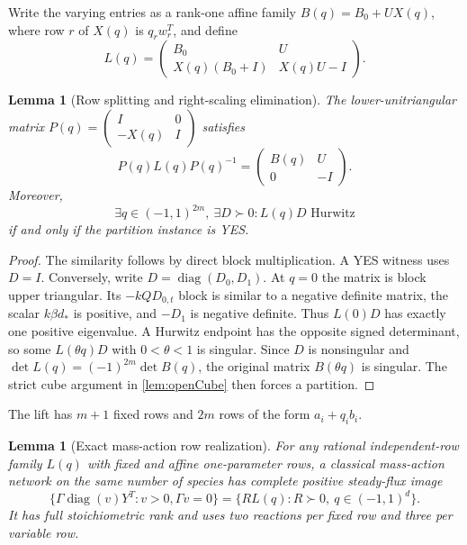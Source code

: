 \documentclass[11pt]{article}
\newtheorem{lemma}[theorem]{Lemma}
\theoremstyle{definition}
\newcommand{\diag}{\operatorname{diag}}
\begin{document}
Write the varying entries as a rank-one affine family
$B(q)=B_0+UX(q)$, where row $r$ of $X(q)$ is $q_rw_r^T$, and define
\begin{equation}
 L(q)=\begin{pmatrix}
 B_0&U\\
 X(q)(B_0+I)&X(q)U-I
 \end{pmatrix}.
 \label{eq:lift}
\end{equation}

\begin{lemma}[Row splitting and right-scaling elimination]
\label{lem:scaling}
The lower-unitriangular matrix
$P(q)=\left(\begin{smallmatrix}I&0\\-X(q)&I\end{smallmatrix}\right)$ satisfies
\[
 P(q)L(q)P(q)^{-1}
 =\begin{pmatrix}B(q)&U\\0&-I\end{pmatrix}.
\]
Moreover,
\[
 \exists q\in(-1,1)^{2m},\ \exists D\succ0:
 L(q)D\text{ Hurwitz}
\]
if and only if the partition instance is YES.
\end{lemma}

\begin{proof}
The similarity follows by direct block multiplication.  A YES witness uses
$D=I$.  Conversely, write $D=\diag(D_0,D_1)$.  At $q=0$ the matrix is block
upper triangular.  Its $-kQD_{0,t}$ block is similar to a negative definite
matrix, the scalar $k\beta d_*$ is positive, and $-D_1$ is negative definite.
Thus $L(0)D$ has exactly one positive eigenvalue.  A Hurwitz endpoint has the
opposite signed determinant, so some $L(\theta q)D$ with $0<\theta<1$ is
singular.  Since $D$ is nonsingular and
$\det L(q)=(-1)^{2m}\det B(q)$, the original matrix $B(\theta q)$ is singular.
The strict cube argument in \cref{lem:openCube} then forces a partition.
\end{proof}

The lift has $m+1$ fixed rows and $2m$ rows of the form $a_i+q_ib_i$.

\begin{lemma}[Exact mass-action row realization]
\label{lem:rowrealization}
For any rational independent-row family $L(q)$ with fixed and affine
one-parameter rows, a classical mass-action network on the same number of
species has complete positive steady-flux image
\[
 \{\Gamma\diag(v)Y^T:v>0,\Gamma v=0\}
 =\{R L(q):R\succ0,\ q\in(-1,1)^d\}.
\]
It has full stoichiometric rank and uses two reactions per fixed row and three
per variable row.
\end{lemma}
\end{document}

